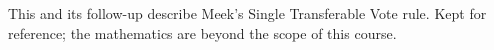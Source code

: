 This and its follow-up describe Meek's Single Transferable Vote rule.  Kept for reference; the mathematics are beyond the scope of this course.
